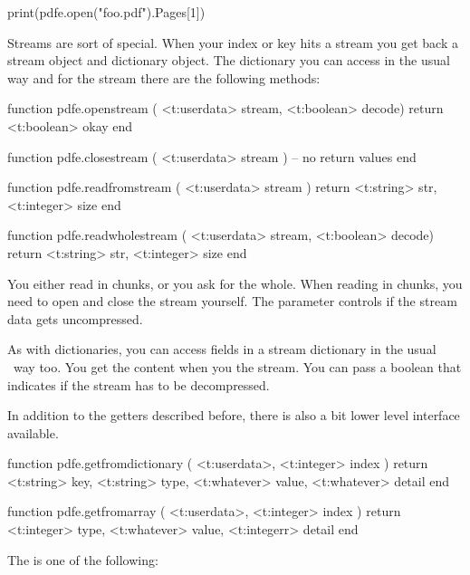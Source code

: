 \starttyping[option=LUA]
print(pdfe.open("foo.pdf").Pages[1])
\stoptyping

\stopsubsection

\startsubsection[title={Streams}]

Streams are sort of special. When your index or key hits a stream you get back a
stream object and dictionary object. The dictionary you can access in the usual
way and for the stream there are the following methods:

\starttyping[option=LUA]
function pdfe.openstream ( <t:userdata> stream, <t:boolean> decode)
    return <t:boolean> okay
end

function pdfe.closestream ( <t:userdata> stream )
    -- no return values
end

function pdfe.readfromstream ( <t:userdata> stream )
    return
        <t:string>  str,
        <t:integer> size
end

function pdfe.readwholestream ( <t:userdata> stream, <t:boolean> decode)
    return
        <t:string>  str,
        <t:integer> size
end
\stoptyping

You either read in chunks, or you ask for the whole. When reading in chunks, you
need to open and close the stream yourself. The  parameter controls
if the stream data gets uncompressed.

As with dictionaries, you can access fields in a stream dictionary in the usual
\LUA\ way too. You get the content when you  the stream. You can
pass a boolean that indicates if the stream has to be decompressed.

\stopsubsection

\startsubsection[title={Low level getters}]

In addition to the getters described before, there is also a bit lower level
interface available.

\starttyping[option=LUA]
function pdfe.getfromdictionary ( <t:userdata>, <t:integer> index )
    return
        <t:string>   key,
        <t:string>   type,
        <t:whatever> value,
        <t:whatever> detail
end

function pdfe.getfromarray ( <t:userdata>, <t:integer> index )
    return
        <t:integer>  type,
        <t:whatever> value,
        <t:integerr> detail
end
\stoptyping

The  is one of the following:

\startcolumns[n=4]
\stopcolumns

